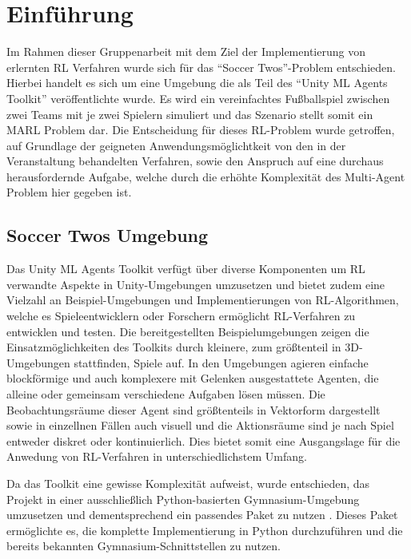 \chapter{Einführung} \label{chapter:1}

Im Rahmen dieser Gruppenarbeit mit dem Ziel der Implementierung von erlernten \acf{RL} Verfahren wurde sich für das \enquote{Soccer Twos}-Problem \cite[p. 15]{juliani2020} entschieden. Hierbei handelt es sich um eine Umgebung die als Teil des \enquote{Unity \ac{ML} Agents Toolkit} \cite{juliani2020} veröffentlichte wurde. Es wird ein vereinfachtes Fußballspiel zwischen zwei Teams mit je zwei Spielern simuliert und das Szenario stellt somit ein \acf{MARL} Problem dar.
Die Entscheidung für dieses \ac{RL}-Problem wurde getroffen, auf Grundlage der geigneten Anwendungsmöglichtkeit von den in der Veranstaltung behandelten Verfahren, sowie den Anspruch auf eine durchaus herausfordernde Aufgabe, welche durch die erhöhte Komplexität des Multi-Agent Problem hier gegeben ist. 

\section{Soccer Twos Umgebung}

Das Unity \ac{ML} Agents Toolkit verfügt über diverse Komponenten um \ac{RL} verwandte Aspekte in Unity-Umgebungen umzusetzen und bietet zudem eine Vielzahl an Beispiel-Umgebungen und Implementierungen von \ac{RL}-Algorithmen, welche es Spieleentwicklern oder Forschern ermöglicht \ac{RL}-Verfahren zu entwicklen und testen. 
Die bereitgestellten Beispielumgebungen zeigen die Einsatzmöglichkeiten des Toolkits durch kleinere, zum größtenteil in 3D-Umgebungen stattfinden, Spiele auf. In den Umgebungen agieren einfache blockförmige und auch komplexere mit Gelenken ausgestattete Agenten, die alleine oder gemeinsam verschiedene Aufgaben lösen müssen. Die Beobachtungsräume dieser Agent sind größtenteils in Vektorform dargestellt sowie in einzellnen Fällen auch visuell und die Aktionsräume sind je nach Spiel entweder diskret oder kontinuierlich. Dies bietet somit eine Ausgangslage für die Anwedung von \ac{RL}-Verfahren in unterschiedlichstem Umfang.

Da das Toolkit eine gewisse Komplexität aufweist, wurde entschieden, das Projekt in einer ausschließlich Python-basierten Gymnasium-Umgebung umzusetzen und dementsprechend ein passendes Paket zu nutzen \cite{soccertwos}. Dieses Paket ermöglichte es, die komplette Implementierung in Python durchzuführen und die bereits bekannten Gymnasium-Schnittstellen zu nutzen.

